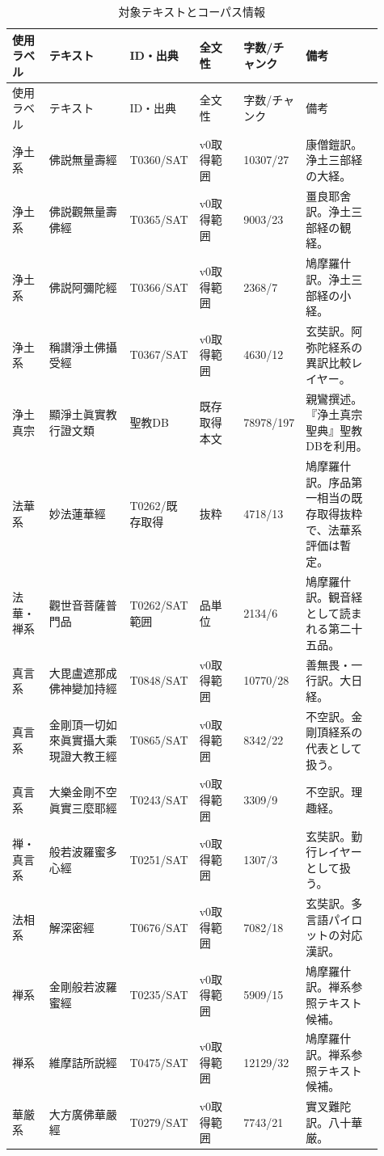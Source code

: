 \documentclass[uplatex,dvipdfmx,11pt,a4paper]{jsarticle}
\begin{document}
{\footnotesize
\setlength{\tabcolsep}{2pt}
\begin{longtable}{@{}p{0.10\linewidth}p{0.22\linewidth}p{0.14\linewidth}p{0.12\linewidth}p{0.12\linewidth}p{0.21\linewidth}@{}}
\caption{対象テキストとコーパス情報}\\
\toprule
使用ラベル & テキスト & ID・出典 & 全文性 & 字数/チャンク & 備考 \\
\midrule
\endfirsthead
\toprule
使用ラベル & テキスト & ID・出典 & 全文性 & 字数/チャンク & 備考 \\
\midrule
\endhead
浄土系 & 佛説無量壽經 & T0360/SAT & v0取得範囲 & 10307/27 & 康僧鎧訳。浄土三部経の大経。 \\
浄土系 & 佛説觀無量壽佛經 & T0365/SAT & v0取得範囲 & 9003/23 & 畺良耶舍訳。浄土三部経の観経。 \\
浄土系 & 佛説阿彌陀經 & T0366/SAT & v0取得範囲 & 2368/7 & 鳩摩羅什訳。浄土三部経の小経。 \\
浄土系 & 稱讃淨土佛攝受經 & T0367/SAT & v0取得範囲 & 4630/12 & 玄奘訳。阿弥陀経系の異訳比較レイヤー。 \\
浄土真宗 & 顯淨土眞實教行證文類 & 聖教DB & 既存取得本文 & 78978/197 & 親鸞撰述。『浄土真宗聖典』聖教DBを利用。 \\
法華系 & 妙法蓮華經 & T0262/既存取得 & 抜粋 & 4718/13 & 鳩摩羅什訳。序品第一相当の既存取得抜粋で、法華系評価は暫定。 \\
法華・禅系 & 觀世音菩薩普門品 & T0262/SAT範囲 & 品単位 & 2134/6 & 鳩摩羅什訳。観音経として読まれる第二十五品。 \\
真言系 & 大毘盧遮那成佛神變加持經 & T0848/SAT & v0取得範囲 & 10770/28 & 善無畏・一行訳。大日経。 \\
真言系 & 金剛頂一切如來眞實攝大乘現證大教王經 & T0865/SAT & v0取得範囲 & 8342/22 & 不空訳。金剛頂経系の代表として扱う。 \\
真言系 & 大樂金剛不空眞實三麼耶經 & T0243/SAT & v0取得範囲 & 3309/9 & 不空訳。理趣経。 \\
禅・真言系 & 般若波羅蜜多心經 & T0251/SAT & v0取得範囲 & 1307/3 & 玄奘訳。勤行レイヤーとして扱う。 \\
法相系 & 解深密經 & T0676/SAT & v0取得範囲 & 7082/18 & 玄奘訳。多言語パイロットの対応漢訳。 \\
禅系 & 金剛般若波羅蜜經 & T0235/SAT & v0取得範囲 & 5909/15 & 鳩摩羅什訳。禅系参照テキスト候補。 \\
禅系 & 維摩詰所説經 & T0475/SAT & v0取得範囲 & 12129/32 & 鳩摩羅什訳。禅系参照テキスト候補。 \\
華厳系 & 大方廣佛華嚴經 & T0279/SAT & v0取得範囲 & 7743/21 & 實叉難陀訳。八十華厳。 \\
\bottomrule
\end{longtable}
}
\end{document}
